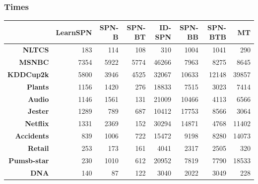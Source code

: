 \documentclass[xcolor={usenames,dvipsnames,svgnames}, compress]{beamer}
\begin{document}
\begin{frame}
  \frametitle{Times}
  \begin{table}[htbp]
    \centering
    \tiny
    \setlength{\tabcolsep}{3pt}  
    \begin{tabular}{r r r r r r r r}
      \toprule
      & \textsf{LearnSPN} & \textsf{SPN-B} & \textsf{SPN-BT} & \textsf{ID-SPN} & \textsf{SPN-BB} & \textsf{SPN-BTB} & \textsf{MT} \\
      \midrule                                                                                     
      \textbf{NLTCS}      & 183               & 114            & 108             & 310             & 1004            & 1041             & 290   \\ 
      \textbf{MSNBC}      & 7354              & 5922           & 5774            & 46266           & 7963            & 8275             & 8645  \\ 
      \textbf{KDDCup2k}   & 5800              & 3946           & 4525            & 32067           & 10633           & 12148            & 39857 \\ 
      \textbf{Plants}     & 1156              & 1420           & 276             & 18833           & 7515            & 3023             & 7414  \\ 
      \textbf{Audio}      & 1146              & 1561           & 131             & 21009           & 10466           & 4113             & 6566  \\ 
      \textbf{Jester}     & 1289              & 789            & 687             & 10412           & 17753           & 8566             & 3064  \\ 
      \textbf{Netflix}    & 1331              & 2369           & 152             & 30294           & 14871           & 4768             & 11402 \\ 
      \textbf{Accidents}  & 839               & 1006           & 722             & 15472           & 9198            & 8280             & 14073 \\ 
      \textbf{Retail}     & 253               & 173            & 161             & 4041            & 2317            & 2505             & 320   \\ 
      \textbf{Pumsb-star} & 230               & 1010           & 612             & 20952           & 7819            & 7790             & 18533 \\ 
      \textbf{DNA}        & 140               & 87             & 122             & 3040            & 2022            & 3049             & 228   \\ 

\end{tabular}
\end{table}
\end{frame}
\end{document}
